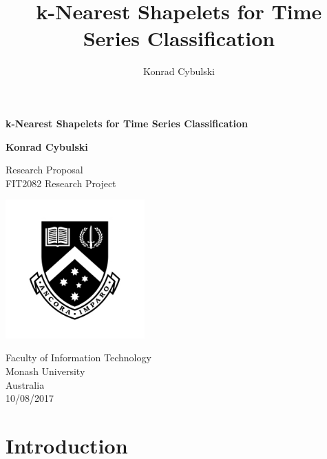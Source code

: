 \documentclass[10pt,a4paper]{article}
\author{Konrad Cybulski}
\title{k-Nearest Shapelets for Time Series Classification}
\begin{document}
\begin{titlepage}
    \begin{center}
        \vspace*{1cm}
        
        \LARGE
        \textbf{k-Nearest Shapelets for Time Series Classification}
        
        \vspace{4cm}
        
		\Large 
        
        \textbf{Konrad Cybulski}
        
        
        \LARGE
        \vspace{2cm}

        
        
        \vfill
        
        
        
        Research Proposal \\
        FIT2082 Research Project
        
        
        \includegraphics[width=0.4\textwidth]{Images/monash_emblem.jpg}
              
        
        \large
        Faculty of Information Technology\\
        Monash University\\
        Australia\\
        10/08/2017
        
    \end{center}
\end{titlepage}

\pagebreak
\tableofcontents
\pagebreak

\section{Introduction} 
\end{document}
